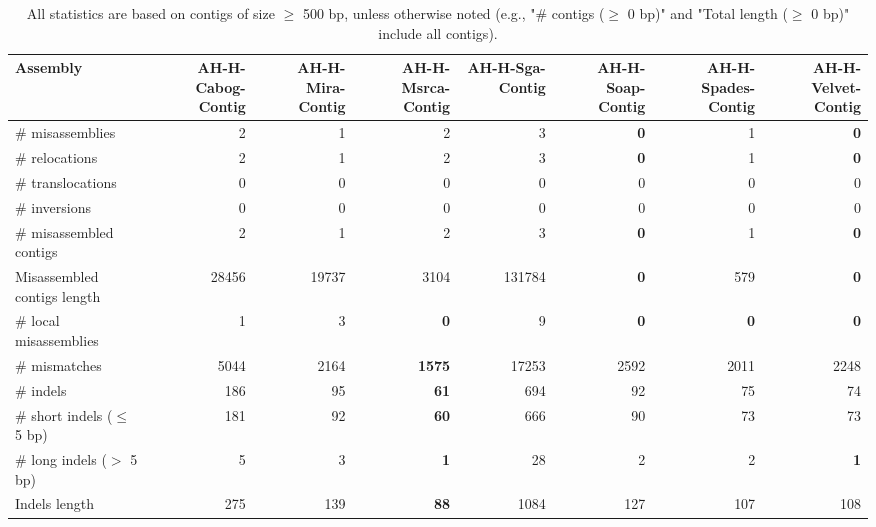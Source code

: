 \documentclass[12pt,a4paper]{article}
\begin{document}
\begin{table}[ht]
\begin{center}
\caption{All statistics are based on contigs of size $\geq$ 500 bp, unless otherwise noted (e.g., "\# contigs ($\geq$ 0 bp)" and "Total length ($\geq$ 0 bp)" include all contigs).}
\begin{tabular}{|l*{7}{|r}|}
\hline
Assembly & AH-H-Cabog-Contig & AH-H-Mira-Contig & AH-H-Msrca-Contig & AH-H-Sga-Contig & AH-H-Soap-Contig & AH-H-Spades-Contig & AH-H-Velvet-Contig \\ \hline
\# misassemblies & 2 & 1 & 2 & 3 & {\bf 0} & 1 & {\bf 0} \\ \hline
\hspace{5mm}\# relocations & 2 & 1 & 2 & 3 & {\bf 0} & 1 & {\bf 0} \\ \hline
\hspace{5mm}\# translocations & 0 & 0 & 0 & 0 & 0 & 0 & 0 \\ \hline
\hspace{5mm}\# inversions & 0 & 0 & 0 & 0 & 0 & 0 & 0 \\ \hline
\# misassembled contigs & 2 & 1 & 2 & 3 & {\bf 0} & 1 & {\bf 0} \\ \hline
Misassembled contigs length & 28456 & 19737 & 3104 & 131784 & {\bf 0} & 579 & {\bf 0} \\ \hline
\# local misassemblies & 1 & 3 & {\bf 0} & 9 & {\bf 0} & {\bf 0} & {\bf 0} \\ \hline
\# mismatches & 5044 & 2164 & {\bf 1575} & 17253 & 2592 & 2011 & 2248 \\ \hline
\# indels & 186 & 95 & {\bf 61} & 694 & 92 & 75 & 74 \\ \hline
\hspace{5mm}\# short indels ($\leq$ 5 bp) & 181 & 92 & {\bf 60} & 666 & 90 & 73 & 73 \\ \hline
\hspace{5mm}\# long indels ($>$ 5 bp) & 5 & 3 & {\bf 1} & 28 & 2 & 2 & {\bf 1} \\ \hline
Indels length & 275 & 139 & {\bf 88} & 1084 & 127 & 107 & 108 \\ \hline
\end{tabular}
\end{center}
\end{table}
\end{document}
